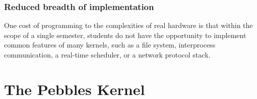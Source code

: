 \subsubsection{Reduced breadth of implementation}

One cost of programming to the complexities of
real hardware is that
within the scope of a single semester,
students do not have the opportunity to
implement common features of many kernels,
such as a file system, interprocess communication,
a real-time scheduler,
or a network protocol stack.

\section{The Pebbles Kernel}
\label{sec:pebbles}

